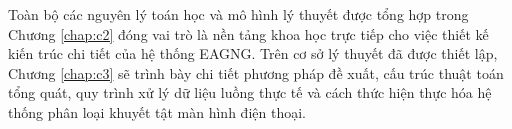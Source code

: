 Toàn bộ các nguyên lý toán học và mô hình lý thuyết được tổng hợp trong Chương \ref{chap:c2} đóng vai trò là nền tảng khoa học trực tiếp cho việc thiết kế kiến trúc chi tiết của hệ thống EAGNG. Trên cơ sở lý thuyết đã được thiết lập, Chương \ref{chap:c3} sẽ trình bày chi tiết phương pháp đề xuất, cấu trúc thuật toán tổng quát, quy trình xử lý dữ liệu luồng thực tế và cách thức hiện thực hóa hệ thống phân loại khuyết tật màn hình điện thoại.